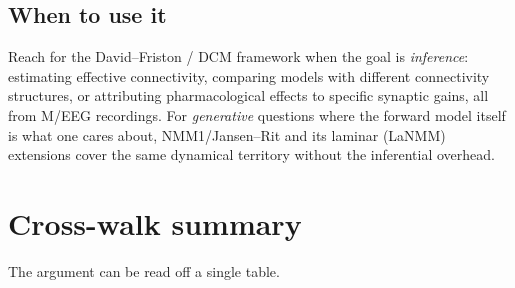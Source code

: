 \documentclass[11pt,a4paper]{article}
\begin{document}
\subsection{When to use it}

Reach for the David--Friston / DCM framework when the goal is \emph{inference}: estimating effective connectivity, comparing models with different connectivity structures, or attributing pharmacological effects to specific synaptic gains, all from M/EEG recordings. For \emph{generative} questions where the forward model itself is what one cares about, NMM1/Jansen--Rit and its laminar (LaNMM) extensions cover the same dynamical territory without the inferential overhead.

\section{Cross-walk summary}
\label{sec:summary}

The argument can be read off a single table.
\end{document}

